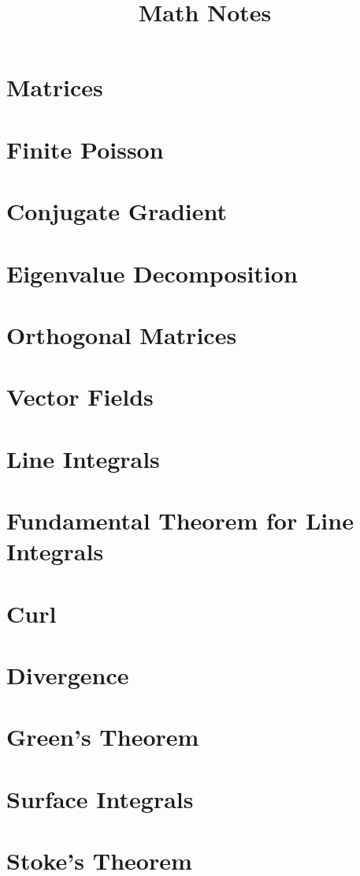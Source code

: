 \documentclass{article}
\theoremstyle{definition}
\begin{document}
\title{Math Notes}
\maketitle
\tableofcontents
\newpage

\section{Matrices}


\section{Finite Poisson}


\section{Conjugate Gradient}


\section{Eigenvalue Decomposition}


\section{Orthogonal Matrices}


\section{Vector Fields}


\section{Line Integrals}

\section{Fundamental Theorem for Line Integrals}


\section{Curl}


\section{Divergence}


\section{Green's Theorem}


\section{Surface Integrals}


\section{Stoke's Theorem}

\end{document}
